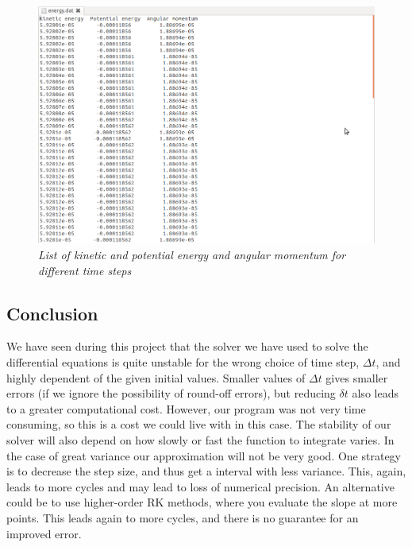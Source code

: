\documentclass[a4paper,12pt, english]{article}
\begin{document}
\begin{figure}[h!]
  \centering
   	 \includegraphics[scale=0.5]{energi.png}
  \caption{\textit{List of kinetic and potential energy and angular momentum for different time steps}}
\end{figure}


\subsection{Conclusion}

We have seen during this project that the solver we have used to solve the differential equations is quite unstable for the wrong choice of time step, $\Delta t$, and highly dependent of the given initial values. Smaller values of $\Delta t$ gives smaller errors (if we ignore the possibility of round-off errors), but reducing $\delta t$ also leads to a greater computational cost. However, our program was not very time consuming, so this is a cost we could live with in this case. The stability of our solver will also depend on how slowly or fast the function to integrate varies. In the case of great variance our approximation will not be very good. One strategy is to decrease the step size, and thus get a interval with less variance. This, again, leads to more cycles and may lead to loss of numerical precision. An alternative could be to use higher-order RK methods, where you evaluate the slope at more points. This leads again to more cycles, and there is no guarantee for an improved error.   
\end{document}
